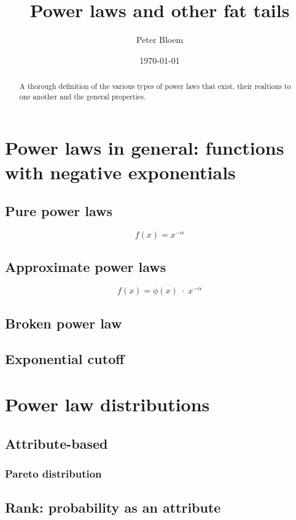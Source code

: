 \documentclass{article}
\title{Power laws and other fat tails}
\date{\today}
\author{Peter Bloem}
\begin{document}
\maketitle

\begin{abstract}
\noindent A thorough definition of the various types of power laws that exist, their realtions to one another and the general properties.
\end{abstract}

\section*{Power laws in general: functions with negative exponentials}
\subsection*{Pure power laws}

\[
f(x) = x^{-\alpha}
\]

\subsection*{Approximate power laws}

\[
f(x) = \phi(x)\;\cdot\;x^{-\alpha}
\]

\subsection*{Broken power law}

\subsection*{Exponential cutoff}

\section*{Power law distributions}

\subsection*{Attribute-based}

\subsubsection*{Pareto distribution}

\subsection*{Rank: probability as an attribute}
\end{document}
